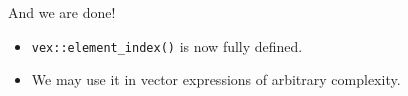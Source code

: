 \documentclass[@BEAMER_OPTIONS@]{beamer}
\newcommand{\code}[1]{\lstinline|#1|}
\begin{document}
\note{ }

\begin{frame}{And we are done!}
    \begin{itemize}
        \item \code{vex::element_index()} is now fully defined.
        \item We may use it in vector expressions of arbitrary complexity.
    \end{itemize}
\end{frame}

\begin{frame}
    \begin{center}
        \begin{Huge}
            \color{chameleon1}{Questions?}
        \end{Huge}
    \end{center}
\end{frame}
\end{document}
